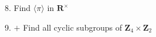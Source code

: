 \begin{mdframed}[style=darkQuesion]
8. Find $\langle\pi\rangle$ in $\mathbf{R}^{\times}$
\end{mdframed}
\begin{mdframed}[style=darkAnswer,frametitle={Joe Starr}]
  
\end{mdframed}
\newpage
\begin{mdframed}[style=darkQuesion]
9. $+$ Find all cyclic subgroups of $\mathbf{Z}_{4} \times \mathbf{Z}_{2}$
\end{mdframed}
\begin{mdframed}[style=darkAnswer,frametitle={Joe Starr}]
  
\end{mdframed}
\newpage
